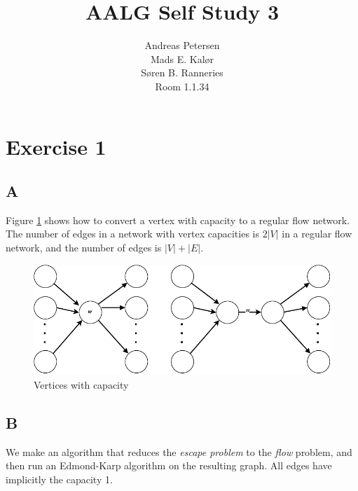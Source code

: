 \documentclass[koma,a4paper]{article}
\title{AALG Self Study 3}
\author{Andreas Petersen\\
Mads E. Kalør\\
Søren B. Ranneries\\
Room 1.1.34}
\begin{document}
\maketitle

\pagebreak

\section{Exercise 1}

\subsection{A}
Figure \ref{fig:vertices_capacity} shows how to convert a vertex with capacity to a regular flow network. The number of edges in a network with vertex capacities is $2|V|$ in a regular flow network, and the number of edges is $|V|+|E|$.

\begin{figure}
  \includegraphics{weighted_vertices}
  \caption{Vertices with capacity}
  \label{fig:vertices_capacity}
\end{figure}

\subsection{B}
We make an algorithm that reduces the \emph{escape problem}  to the \emph{flow} problem, and then run an Edmond-Karp algorithm on the resulting graph. All edges have implicitly the capacity 1.
\end{document}
